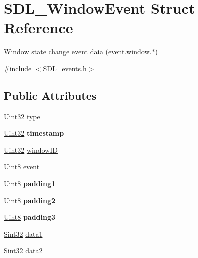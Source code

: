 \hypertarget{structSDL__WindowEvent}{}\section{S\+D\+L\+\_\+\+Window\+Event Struct Reference}
\label{structSDL__WindowEvent}


Window state change event data (\hyperlink{unionSDL__Event_a826936b3275406d857bc6654669fae71}{event.\+window}.$\ast$)  




{\ttfamily \#include $<$S\+D\+L\+\_\+events.\+h$>$}

\subsection*{Public Attributes}
\begin{DoxyCompactItemize}
\item 
\hyperlink{SDL__stdinc_8h_add440eff171ea5f55cb00c4a9ab8672d}{Uint32} \hyperlink{structSDL__WindowEvent_a01c8c8fbe8564e690f958d2db560f657}{type}
\item 
\hypertarget{structSDL__WindowEvent_a7b0bf569b20cfa4e3fb76e3301d616f9}{}\hyperlink{SDL__stdinc_8h_add440eff171ea5f55cb00c4a9ab8672d}{Uint32} {\bfseries timestamp}\label{structSDL__WindowEvent_a7b0bf569b20cfa4e3fb76e3301d616f9}

\item 
\hyperlink{SDL__stdinc_8h_add440eff171ea5f55cb00c4a9ab8672d}{Uint32} \hyperlink{structSDL__WindowEvent_a4b31796ffc84fbb7f6e9ba33e127619a}{window\+I\+D}
\item 
\hyperlink{SDL__stdinc_8h_a2944638813a090aa23e62f4da842c3e2}{Uint8} \hyperlink{structSDL__WindowEvent_a485cd1f07f0f22fdb9f4c4bf214011dc}{event}
\item 
\hypertarget{structSDL__WindowEvent_a09ee59114246eceed4a281033ec6609b}{}\hyperlink{SDL__stdinc_8h_a2944638813a090aa23e62f4da842c3e2}{Uint8} {\bfseries padding1}\label{structSDL__WindowEvent_a09ee59114246eceed4a281033ec6609b}

\item 
\hypertarget{structSDL__WindowEvent_a6bcf773b690b894e8c04c591826d0c8a}{}\hyperlink{SDL__stdinc_8h_a2944638813a090aa23e62f4da842c3e2}{Uint8} {\bfseries padding2}\label{structSDL__WindowEvent_a6bcf773b690b894e8c04c591826d0c8a}

\item 
\hypertarget{structSDL__WindowEvent_ac352263b5fa4ba6dbd64a48062d5e29f}{}\hyperlink{SDL__stdinc_8h_a2944638813a090aa23e62f4da842c3e2}{Uint8} {\bfseries padding3}\label{structSDL__WindowEvent_ac352263b5fa4ba6dbd64a48062d5e29f}

\item 
\hyperlink{SDL__stdinc_8h_a7a90b941db9d4582e9ad7abb9940ff7e}{Sint32} \hyperlink{structSDL__WindowEvent_a01da0025428d3434c80021f3e4089fec}{data1}
\item 
\hyperlink{SDL__stdinc_8h_a7a90b941db9d4582e9ad7abb9940ff7e}{Sint32} \hyperlink{structSDL__WindowEvent_af6cd0a21bc9ecadfee42f6a0147d7171}{data2}
\end{DoxyCompactItemize}


